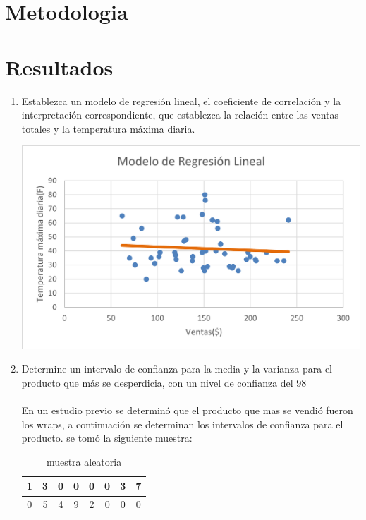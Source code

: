 \documentclass{article}
\begin{document}
\section{Metodologia}
\section{Resultados}
\begin{enumerate}
    \item Establezca un modelo de regresión lineal, el coeficiente de correlación y la interpretación correspondiente, que establezca la relación entre las ventas totales y la temperatura máxima diaria.
          \begin{center}
              \includegraphics[width=\textwidth]{Imagen1.png}
          \end{center}
    \item Determine un intervalo de confianza para la media y la varianza para el producto que más se desperdicia, con un nivel de confianza del 98%
    \paragraph{}En un estudio previo se determinó que el producto que mas se vendió fueron los wraps, a continuación se determinan los intervalos de confianza para el producto.
    se tomó la siguiente muestra:\\
\begin{table}[htbp]
    \centering
    \caption{muestra aleatoria}
      \begin{tabular}{|c|c|c|c|c|c|c|c|}
      \toprule
      1     & 3     & 0     & 0     & 0     & 0     & 3     & 7 \\
      \midrule
      0     & 5     & 4     & 9     & 2     & 0     & 0     & 0 \\
      \bottomrule
      \end{tabular}%
    \label{tab:addlabel}%
  \end{table}%
   

\end{enumerate}
\end{document}
